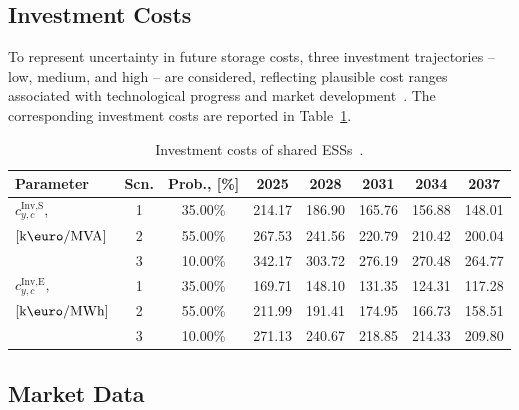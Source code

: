 \documentclass[preprint,12pt]{elsarticle}
\begin{document}
\subsection{Investment Costs}

To represent uncertainty in future storage costs, three investment trajectories -- low, medium, and high -- are considered, reflecting plausible cost ranges associated with technological progress and market development~\cite{nrel_ess_costs,iea_ess_2024}. The corresponding investment costs are reported in Table~\ref{tab:investment_cost}.

\begin{table}[htbp!]
    \centering
    \caption{Investment costs of shared ESSs~\cite{nrel_ess_costs}.}
    \begin{tabular}{lcc ccccc}
        \toprule
        Parameter & Scn. & Prob., [\%] & 2025 & 2028 & 2031 & 2034 & 2037 \\ 
        \midrule
        $c^\text{Inv,S}_{y,c}$,     & 1 & 35.00\% & 214.17 & 186.90 & 165.76 & 156.88 & 148.01\\ 
        $\left[\text{k\euro/MVA}\right]$ & 2 & 55.00\% & 267.53 & 241.56 & 220.79 & 210.42 & 200.04\\
        ~                           & 3 & 10.00\% & 342.17 & 303.72 & 276.19 & 270.48 & 264.77\\
        \midrule
        $c^\text{Inv,E}_{y,c}$, & 1 & 35.00\% & 169.71 & 148.10 & 131.35 & 124.31 & 117.28\\ 
        $\left[\text{k\euro/MWh}\right]$ & 2 & 55.00\% & 211.99 & 191.41 & 174.95 & 166.73 & 158.51\\ 
        ~                           & 3 & 10.00\% & 271.13 & 240.67 & 218.85 & 214.33 & 209.80\\ 
        \bottomrule
    \end{tabular}
    \label{tab:investment_cost}
\end{table}


\subsection{Market Data}
\end{document}
